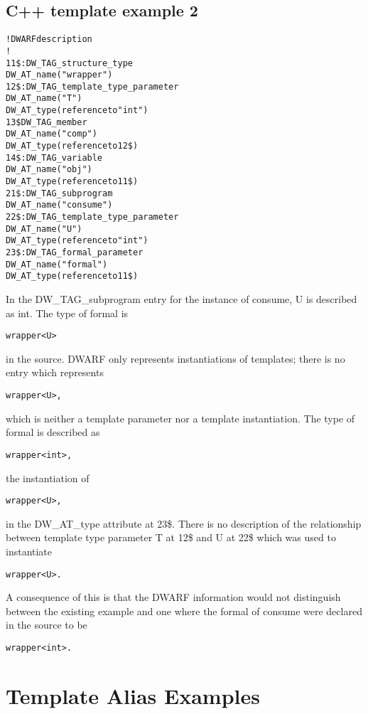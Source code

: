 \subsection{C++ template example 2}
\label{app:ctemplateexample2}
\begin{alltt}
! DWARF description
!
11\$: DW\_TAG\_structure\_type
        DW\_AT\_name("wrapper")
12\$:   DW\_TAG\_template\_type\_parameter
            DW\_AT\_name("T")
            DW\_AT\_type(reference to "int")
13\$    DW\_TAG\_member
            DW\_AT\_name("comp")
            DW\_AT\_type(reference to 12\$)
14\$: DW\_TAG\_variable
        DW\_AT\_name("obj")
        DW\_AT\_type(reference to 11\$)
21\$: DW\_TAG\_subprogram
        DW\_AT\_name("consume")
22\$:   DW\_TAG\_template\_type\_parameter
            DW\_AT\_name("U")
            DW\_AT\_type(reference to "int")
23\$:   DW\_TAG\_formal\_parameter
            DW\_AT\_name("formal")
            DW\_AT\_type(reference to 11\$)
\end{alltt}

In the DW\_TAG\_subprogram entry for the instance of consume,
U is described as 
int. 
The type of formal is 
\begin{alltt}
wrapper<U>
\end{alltt}
 in
the source. DWARF only represents instantiations of templates;
there is no entry which represents 
\begin{alltt}
wrapper<U>, 
\end{alltt}
which is neither
a template parameter nor a template instantiation. The type
of formal is described as 
\begin{alltt}
wrapper<int>, 
\end{alltt}
the instantiation of
\begin{alltt}
wrapper<U>, 
\end{alltt}
in the DW\_AT\_type attribute at 
23\$. 
There is no
description of the relationship between template type parameter
T at 12\$ and U at 
22\$ which was used to instantiate 
\begin{alltt}
wrapper<U>.
\end{alltt}

A consequence of this is that the DWARF information would
not distinguish between the existing example and one where
the formal of consume were declared in the source to be
\begin{alltt}
wrapper<int>.
\end{alltt}

\section{Template Alias Examples}
\label{app:templatealiasexample}


